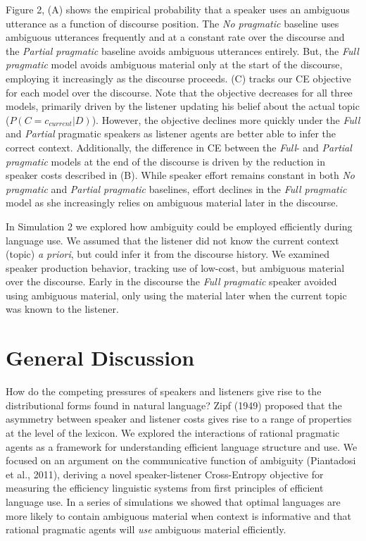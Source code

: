 \documentclass[10pt, letterpaper]{article}
\begin{document}
Figure 2, (A) shows the empirical probability that a speaker uses an
ambiguous utterance as a function of discourse position. The
\textit{No pragmatic} baseline uses ambiguous utterances frequently and
at a constant rate over the discourse and the \textit{Partial pragmatic}
baseline avoids ambiguous utterances entirely. But, the
\textit{Full pragmatic} model avoids ambiguous material only at the
start of the discourse, employing it increasingly as the discourse
proceeds. (C) tracks our CE objective for each model over the discourse.
Note that the objective decreases for all three models, primarily driven
by the listener updating his belief about the actual topic
(\(P(C=c_{current}|D)\)). However, the objective declines more quickly
under the \textit{Full} and \textit{Partial} pragmatic speakers as
listener agents are better able to infer the correct context.
Additionally, the difference in CE between the \textit{Full}- and
\textit{Partial pragmatic} models at the end of the discourse is driven
by the reduction in speaker costs described in (B). While speaker effort
remains constant in both \textit{No pragmatic} and
\textit{Partial pragmatic} baselines, effort declines in the
\textit{Full pragmatic} model as she increasingly relies on ambiguous
material later in the discourse.\par

In Simulation 2 we explored how ambiguity could be employed efficiently
during language use. We assumed that the listener did not know the
current context (topic) \textit{a priori}, but could infer it from the
discourse history. We examined speaker production behavior, tracking use
of low-cost, but ambiguous material over the discourse. Early in the
discourse the \textit{Full pragmatic} speaker avoided using ambiguous
material, only using the material later when the current topic was known
to the listener.

\section{General Discussion}\label{general-discussion}

How do the competing pressures of speakers and listeners give rise to
the distributional forms found in natural language? Zipf (1949) proposed
that the asymmetry between speaker and listener costs gives rise to a
range of properties at the level of the lexicon. We explored the
interactions of rational pragmatic agents as a framework for
understanding efficient language structure and use. We focused on an
argument on the communicative function of ambiguity (Piantadosi et al.,
2011), deriving a novel speaker-listener Cross-Entropy objective for
measuring the efficiency linguistic systems from first principles of
efficient language use. In a series of simulations we showed that
optimal languages are more likely to contain ambiguous material when
context is informative and that rational pragmatic agents will
\emph{use} ambiguous material efficiently.\par
\end{document}

